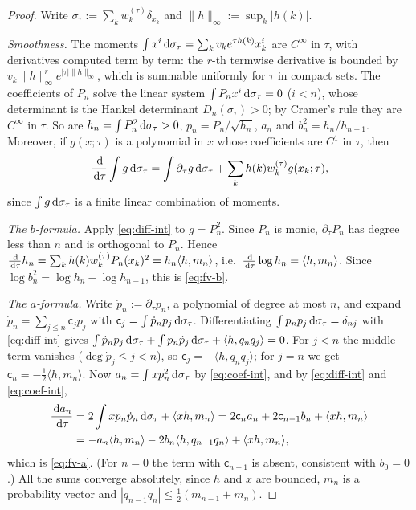 \begin{proof}
Write $\sigma_\tau:=\sum_kw^{(\tau)}_k\delta_{x_k}$ and $\|h\|_\infty:=\sup_k|h(k)|$.

\emph{Smoothness.} The moments $\int x^i\,\mathrm{d}\sigma_\tau=\sum_kv_ke^{\tau h(k)}x_k^i$ are $C^\infty$ in $\tau$, with
derivatives computed term by term: the $r$-th termwise derivative is bounded by $v_k\|h\|_\infty^re^{|\tau|\|h\|_\infty}$, which is summable
uniformly for $\tau$ in compact sets. The coefficients of $P_n$ solve the linear system $\int P_nx^i\,\mathrm{d}\sigma_\tau=0$
($i<n$), whose determinant is the Hankel determinant $D_n(\sigma_\tau)>0$; by Cramer's rule they are $C^\infty$ in
$\tau$. So are $h_n=\int P_n^2\,\mathrm{d}\sigma_\tau>0$, $p_n=P_n/\sqrt{h_n}$, $a_n$ and $b_n^2=h_n/h_{n-1}$. Moreover, if
$g(x;\tau)$ is a polynomial in $x$ whose coefficients are $C^1$ in $\tau$, then
\begin{equation}\label{eq:diff-int}
  \frac{\,\mathrm{d}}{\,\mathrm{d}\tau}\int g\,\mathrm{d}\sigma_\tau=\int\partial_\tau g\,\mathrm{d}\sigma_\tau+\sum_kh(k)w^{(\tau)}_kg(x_k;\tau),
\end{equation}
since $\int g\,\mathrm{d}\sigma_\tau$ is a finite linear combination of moments.

\emph{The $b$-formula.} Apply \eqref{eq:diff-int} to $g=P_n^2$. Since $P_n$ is monic, $\partial_\tau P_n$ has degree
less than $n$ and is orthogonal to $P_n$. Hence $\frac{\,\mathrm{d}}{\,\mathrm{d}\tau}h_n=\sum_kh(k)w^{(\tau)}_kP_n(x_k)^2=h_n\langle
h,m_n\rangle$, i.e.\ $\frac{\,\mathrm{d}}{\,\mathrm{d}\tau}\log h_n=\langle h,m_n\rangle$. Since $\log b_n^2=\log h_n-\log h_{n-1}$, this
is \eqref{eq:fv-b}.

\emph{The $a$-formula.} Write $\dot p_n:=\partial_\tau p_n$, a polynomial of degree at most $n$, and expand
$\dot p_n=\sum_{j\le n}\mathsf c_jp_j$ with $\mathsf c_j=\int\dot p_np_j\,\mathrm{d}\sigma_\tau$. Differentiating
$\int p_np_j\,\mathrm{d}\sigma_\tau=\delta_{nj}$ with \eqref{eq:diff-int} gives
$\int\dot p_np_j\,\mathrm{d}\sigma_\tau+\int p_n\dot p_j\,\mathrm{d}\sigma_\tau+\langle h,q_nq_j\rangle=0$. For $j<n$ the middle term
vanishes ($\deg\dot p_j\le j<n$), so $\mathsf c_j=-\langle h,q_nq_j\rangle$; for $j=n$ we get $\mathsf c_n=-\frac12\langle
h,m_n\rangle$. Now $a_n=\int xp_n^2\,\mathrm{d}\sigma_\tau$ by \eqref{eq:coef-int}, and by \eqref{eq:diff-int} and
\eqref{eq:coef-int},
\begin{align*}
  \frac{\,\mathrm{d} a_n}{\,\mathrm{d}\tau}&=2\int xp_n\dot p_n\,\mathrm{d}\sigma_\tau+\langle xh,m_n\rangle
  =2\mathsf c_na_n+2\mathsf c_{n-1}b_n+\langle xh,m_n\rangle\\
  &=-a_n\langle h,m_n\rangle-2b_n\langle h,q_{n-1}q_n\rangle+\langle xh,m_n\rangle,
\end{align*}
which is \eqref{eq:fv-a}. (For $n=0$ the term with $\mathsf c_{n-1}$ is absent, consistent with $b_0=0$.) All the sums
converge absolutely, since $h$ and $x$ are bounded, $m_n$ is a probability vector and $|q_{n-1}q_n|\le\frac12(m_{n-1}+m_n)$.
\end{proof}

